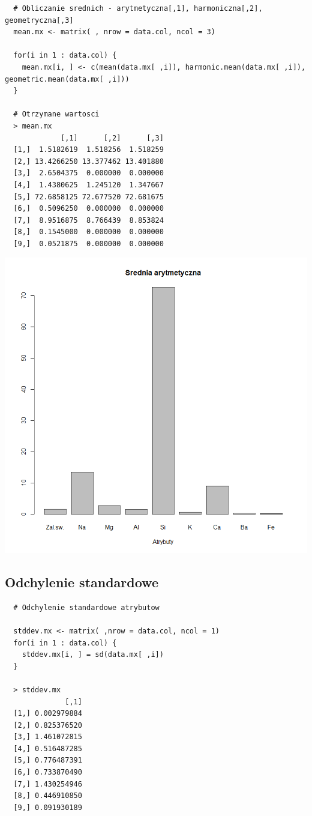 \documentclass[a4paper,12pt,twoside]{article}
\begin{document}
\medskip
\begin{lstlisting}
  # Obliczanie srednich - arytmetyczna[,1], harmoniczna[,2], geometryczna[,3]
  mean.mx <- matrix( , nrow = data.col, ncol = 3)

  for(i in 1 : data.col) {
    mean.mx[i, ] <- c(mean(data.mx[ ,i]), harmonic.mean(data.mx[ ,i]), geometric.mean(data.mx[ ,i]))
  }

  # Otrzymane wartosci
  > mean.mx
             [,1]      [,2]      [,3]
  [1,]  1.5182619  1.518256  1.518259
  [2,] 13.4266250 13.377462 13.401880
  [3,]  2.6504375  0.000000  0.000000
  [4,]  1.4380625  1.245120  1.347667
  [5,] 72.6858125 72.677520 72.681675
  [6,]  0.5096250  0.000000  0.000000
  [7,]  8.9516875  8.766439  8.853824
  [8,]  0.1545000  0.000000  0.000000
  [9,]  0.0521875  0.000000  0.000000
\end{lstlisting}

\begin{center}
\includegraphics[width=.9\textwidth]{img/1_srednia_arytmetyczna.png}
\end{center}

\subsection{Odchylenie standardowe}

\begin{lstlisting}
  # Odchylenie standardowe atrybutow

  stddev.mx <- matrix( ,nrow = data.col, ncol = 1)
  for(i in 1 : data.col) {
    stddev.mx[i, ] = sd(data.mx[ ,i])
  }

  > stddev.mx
              [,1]
  [1,] 0.002979884
  [2,] 0.825376520
  [3,] 1.461072815
  [4,] 0.516487285
  [5,] 0.776487391
  [6,] 0.733870490
  [7,] 1.430254946
  [8,] 0.446910850
  [9,] 0.091930189
\end{lstlisting}
\end{document}
